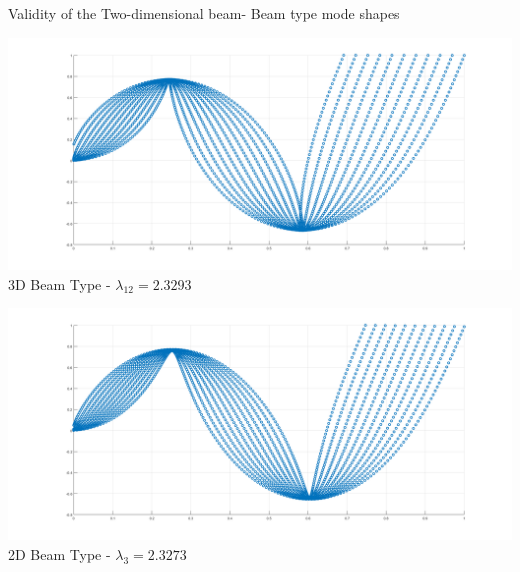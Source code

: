 \documentclass[8pt]{beamer}
\begin{document}
        \begin{frame}{Validity of the Two-dimensional beam- Beam type mode shapes}
            \centering
            \begin{minipage}[b]{0.45\textwidth}
                \includegraphics[width=\textwidth]{3D12.png}
                \\ 3D Beam Type - $\lambda_{12} = 2.3293$
                \label{fig:minipage2}
            \end{minipage}
            \hfill
            \begin{minipage}[b]{0.45\textwidth}
                \includegraphics[width=\textwidth]{2D3.png}
                \\ 2D Beam Type - $\lambda_3 = 2.3273$
                \label{fig:minipage1}
            \end{minipage}
        
            \vspace{1em} %
        

\end{frame}
\end{document}
